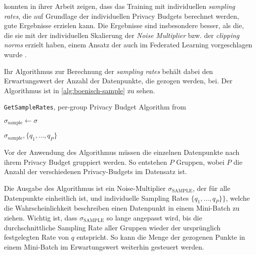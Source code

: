 \textcite{boenisch:2023} konnten in ihrer Arbeit zeigen, dass das Training mit individuellen \textit{sampling rates}, die auf Grundlage der individuellen Privacy Budgets berechnet werden, gute Ergebnisse erzielen kann. Die Ergebnisse sind insbesondere besser, als die, die sie mit der individuellen Skalierung der \textit{Noise Multiplier} bzw. der \textit{clipping norms} erzielt haben, einem Ansatz der auch im Federated Learning vorgeschlagen wurde \cite{aldaghri:2023}. 

Ihr Algorithmus zur Berechnung der \textit{sampling rates} behält dabei den Erwartungswert der Anzahl der Datenpunkte, die gezogen werden, bei. Der Algorithmus ist in \autoref{alg:boenisch-sample} zu sehen.

\begin{algorithm}[tb]
	\caption{\texttt{GetSampleRates}, per-group Privacy Budget Algorithm from \cite[p.6]{boenisch:2023}}
	\label{alg:boenisch-sample}
	
	
	\BlankLine
	$\sigma_\text{sample} \leftarrow \sigma$
	
	\KwRet $\sigma_\text{sample}, \{q_1, \dots, q_P\}$\;
\end{algorithm}

Vor der Anwendung des Algorithmus müssen die einzelnen Datenpunkte nach ihrem Privacy Budget gruppiert werden. So entstehen $P$ Gruppen, wobei $P$ die Anzahl der verschiedenen Privacy-Budgets im Datensatz ist.

Die Ausgabe des Algorithmus ist ein Noise-Multiplier $\sigma_{\text{SAMPLE}}$, der für alle Datenpunkte einheitlich ist, und individuelle Sampling Rates $\{q_1, ..., q_P\}\}$, welche die Wahrscheinlichkeit beschreiben einen Datenpunkt in einem Mini-Batch zu ziehen. Wichtig ist, dass $\sigma_{\text{SAMPLE}}$ so lange angepasst wird, bis die durchschnittliche Sampling Rate aller Gruppen wieder der ursprünglich festgelegten Rate von $q$ entspricht. So kann die Menge der gezogenen Punkte in einem Mini-Batch im Erwartungswert weiterhin gesteuert werden.

